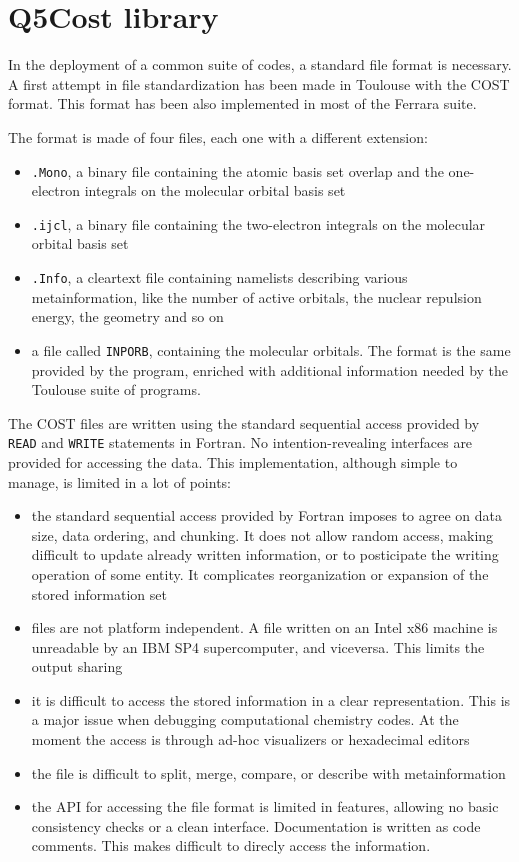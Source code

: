\section{Q5Cost library}

In the deployment of a common suite of codes, a standard file format is
necessary.  A first attempt in file standardization has been made in
Toulouse with the COST format. This format has been also implemented in most
of the Ferrara suite.

The format is made of four files, each one with a different extension:
\begin{itemize}
\item \texttt{.Mono}, a binary file containing the atomic basis set overlap and the one-electron
integrals on the molecular orbital basis set
\item \texttt{.ijcl}, a binary file containing the two-electron integrals
on the molecular orbital basis set
\item \texttt{.Info}, a cleartext file containing namelists describing various
metainformation, like the number of active orbitals, the nuclear
repulsion energy, the geometry and so on
\item a file called \texttt{INPORB}, containing the molecular orbitals. The format is
the same provided by the \molcas program, enriched with additional
information needed by the Toulouse suite of programs.
\end{itemize}

The COST files are written using the standard sequential access provided by
\texttt{READ} and \texttt{WRITE} statements in Fortran. No
{intention-revealing} interfaces are provided for accessing the data. This
implementation, although simple to manage, is limited in a lot of points:

\begin{itemize}
\item the standard sequential access provided by Fortran imposes to agree
on data size, data ordering, and chunking. It does not allow random access,
making difficult to update already written information, or to posticipate
the writing operation of some entity. It complicates reorganization
or expansion of the stored information set
\item files are not platform independent. A file written on an Intel
x86 machine is unreadable by an IBM SP4 supercomputer, and viceversa. This
limits the output sharing
\item it is difficult to access the stored information in a clear
representation. This is a major issue when debugging computational chemistry
codes. At the moment the access is through ad-hoc visualizers or hexadecimal
editors
\item the file is difficult to split, merge, compare, or describe with
metainformation
\item the API for accessing the file format is limited in features,
allowing no basic consistency checks or a clean interface. Documentation 
is written as code comments. This makes difficult to direcly access the
information.
\end{itemize}

